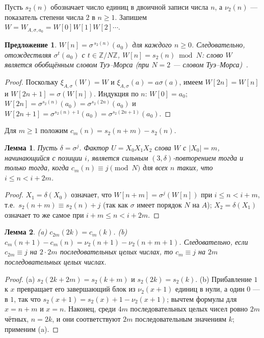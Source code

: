 \documentclass[a4paper,14pt]{extreport}
\theoremstyle{plain}
\newtheorem{lemma}{Лемма}[section]
\newtheorem{proposition}[theorem]{Предложение}
\theoremstyle{definition}
\theoremstyle{remark}
\begin{document}
Пусть $s_2(n)$ обозначает число единиц в двоичной записи числа $n$, а $\nu_2(n)$ --- показатель степени числа $2$ в $n\ge1$.
Запишем $W=W_{A,\sigma,a_0}=W[0]W[1]W[2]\cdots$.

\begin{proposition}\label{prop:gTM}
	$W[n]=\sigma^{\,s_2(n)}(a_0)$ для каждого $n\ge0$. Следовательно, отождествляя $\sigma^t(a_0)$ с $t\in\mathbb Z/N\mathbb Z$,
	$W[n]=s_2(n) \bmod N$: слово $W$ является обобщённым словом Туэ--Морса (при $N=2$ --- словом Туэ--Морса)~\cite{Allouche}.
\end{proposition}
\begin{proof}
	Поскольку $\xi_{A,\sigma}(W)=W$ и $\xi_{A,\sigma}(a)=a\sigma(a)$, имеем $W[2n]=W[n]$ и $W[2n+1]=\sigma(W[n])$.
	Индукция по $n$: $W[0]=a_0$; $W[2n]=\sigma^{s_2(n)}(a_0)=\sigma^{s_2(2n)}(a_0)$ и
	$W[2n+1]=\sigma^{s_2(n)+1}(a_0)=\sigma^{s_2(2n+1)}(a_0)$.
\end{proof}

Для $m\ge1$ положим $c_m(n)=s_2(n+m)-s_2(n)$.

\begin{lemma}\label{lem:arith}
	Пусть $\delta=\sigma^j$. Фактор $U=X_0X_1X_2$ слова $W$ с $|X_0|=m$, начинающийся с позиции $i$, является сильным $(3,\delta)$-повторением
	тогда и только тогда, когда $c_m(n)\equiv j \pmod N$ для всех $n$ таких, что $i\le n<i+2m$.
\end{lemma}
\begin{proof}
	$X_1=\delta(X_0)$ означает, что $W[n+m]=\sigma^j(W[n])$ при $i\le n<i+m$, т.е.\ $s_2(n+m)\equiv s_2(n)+j$ (так как $\sigma$ имеет порядок $N$ на $A$);
	$X_2=\delta(X_1)$ означает то же самое при $i+m\le n<i+2m$.
\end{proof}

\begin{lemma}\label{lem:half}
	(a) $c_{2m}(2k)=c_m(k)$. (b) $c_m(n+1)-c_m(n)=\nu_2(n+1)-\nu_2(n+m+1)$.
	Следовательно, если $c_{2m}\equiv j$ на $2\cdot 2m$ последовательных целых числах, то $c_m\equiv j$ на $2m$ последовательных целых числах.
\end{lemma}
\begin{proof}
	(a) $s_2(2k+2m)=s_2(k+m)$ и $s_2(2k)=s_2(k)$. (b) Прибавление $1$ к $x$ превращает его завершающий блок из $\nu_2(x+1)$ единиц в нули, а один $0$ --- в $1$,
	так что $s_2(x+1)=s_2(x)+1-\nu_2(x+1)$; вычтем формулы для $x=n+m$ и $x=n$. Наконец, среди $4m$ последовательных целых чисел ровно $2m$ чётных, $n=2k$,
	и они соответствуют $2m$ последовательным значениям $k$; применим (a).
\end{proof}
\end{document}
